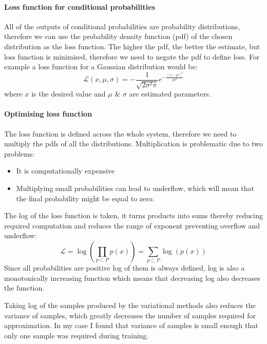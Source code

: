 \documentclass[12pt,a4paper]{book}
\begin{document}
\paragraph{Loss function for conditional probabilities}
All of the outputs of conditional probabilities are probability distributions, therefore we can use the probability density function (pdf) of the chosen distribution as the loss function.
The higher the pdf, the better the estimate, but loss function is minimised, therefore we need to negate the pdf to define loss.
For example a loss function for a Gaussian distribution would be:
\begin{equation}
\mathcal{L}(x,\mu,\sigma) = -\frac{1}{\sqrt{2\sigma^2\pi}}e^{-\frac{(x-\mu)^2}{2\sigma^2}}
\label{eq:gaussian-loss}
\end{equation}
where $x$ is the desired value and $\mu$ \& $\sigma$ are estimated parameters.

\paragraph{Optimising loss function}
The loss function is defined across the whole system, therefore we need to multiply the pdfs of all the distributions.
Multiplication is problematic due to two problems:
\begin{itemize}
\item It is computationally expensive
\item Multiplying small probabilities can lead to underflow, which will mean that the final probability might be equal to zero.
\end{itemize}
The log of the loss function is taken, it turns products into sums thereby reducing required computation and reduces the range of exponent preventing overflow and underflow:
\begin{equation*}
\mathcal{L} = \log\left(\prod_{p\subset P}p(x)\right) = \sum_{p\subset P}\log(p(x))
\end{equation*}
Since all probabilities are positive log of them is always defined, log is also a monotonically increasing function which means that decreasing log also decreases the function.

Taking log of the samples produced by the variational methods also reduces the variance of samples, which greatly decreases the number of samples required for approximation.
In my case I found that variance of samples is small enough that only one sample was required during training.
\end{document}
